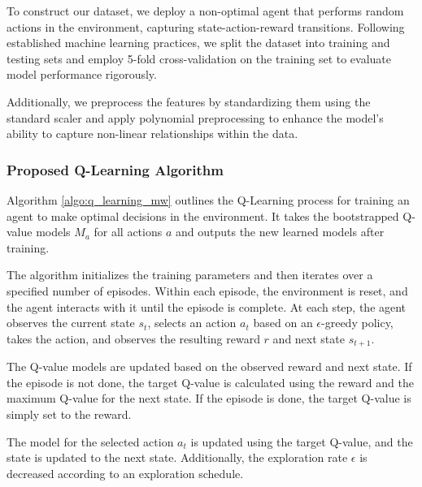 To construct our dataset, we deploy a non-optimal agent that performs random actions in the environment, capturing state-action-reward transitions. Following established machine learning practices, we split the dataset into training and testing sets and employ 5-fold cross-validation on the training set to evaluate model performance rigorously.

Additionally, we preprocess the features by standardizing them using the standard scaler and apply polynomial preprocessing to enhance the model's ability to capture non-linear relationships within the data.


\subsubsection{Proposed Q-Learning Algorithm}

Algorithm \ref{algo:q_learning_mw} outlines the Q-Learning process for training an agent to make optimal decisions in the environment. It takes the bootstrapped Q-value models $M_a$ for all actions $a$ and outputs the new learned models after training.

The algorithm initializes the training parameters and then iterates over a specified number of episodes. Within each episode, the environment is reset, and the agent interacts with it until the episode is complete. At each step, the agent observes the current state $s_t$, selects an action $a_t$ based on an $\epsilon$-greedy policy, takes the action, and observes the resulting reward $r$ and next state $s_{t+1}$.

The Q-value models are updated based on the observed reward and next state. If the episode is not done, the target Q-value is calculated using the reward and the maximum Q-value for the next state. If the episode is done, the target Q-value is simply set to the reward.

The model for the selected action $a_t$ is updated using the target Q-value, and the state is updated to the next state. Additionally, the exploration rate $\epsilon$ is decreased according to an exploration schedule.


